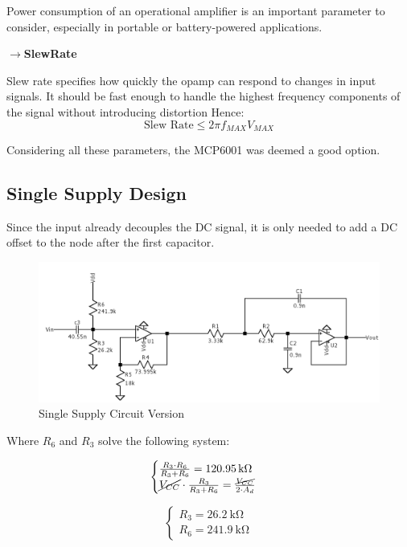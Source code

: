 Power consumption of an operational amplifier is an important parameter to consider, especially in portable or battery-powered applications.

$\rightarrow$\textbf{SlewRate}

Slew rate specifies how quickly the opamp can respond to changes in input signals. It should be fast enough to handle the highest frequency components of the signal without introducing distortion
Hence:
\begin{equation}
    \text{Slew Rate}\leq 2\pi f_{MAX} V_{MAX}
\end{equation}

Considering all these parameters, the MCP6001 was deemed a good option.
\subsection{Single Supply Design}

Since the input already decouples the DC signal, it is only needed to add a DC offset to the node after the first capacitor.

\begin{figure}[H]
    \centering
    \includegraphics*[scale = 0.25]{Images/P2CircSingSup.png}
    \caption{Single Supply Circuit Version}
\end{figure}

Where $R_6$ and $R_3$ solve the following system:

\begin{equation}
    \begin{cases}
        \frac{R_3 \cdot R_6}{R_3 + R_6} = \SI{120,95}{\kilo\ohm}\\
        \cancel{V_{CC}}\cdot\frac{R_3}{R_3 + R_6} = \frac{\cancel{V_{CC}}}{2\cdot A_d} 
    \end{cases}
\end{equation}

\begin{equation}
    \begin{cases}
        R_3 = \SI{26.2}{\kilo\ohm} \\
        R_6 = \SI{241.9}{\kilo\ohm}
    \end{cases}
    \label{eq:sysSol}
\end{equation}

